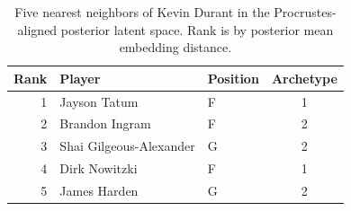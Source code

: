 \begin{table}[htbp]
  \centering\small
  \begin{tabular}{rllc}
    \toprule
    Rank & Player & Position & Archetype \\
    \midrule
    1 & Jayson Tatum & F & 1 \\
    2 & Brandon Ingram & F & 2 \\
    3 & Shai Gilgeous-Alexander & G & 2 \\
    4 & Dirk Nowitzki & F & 1 \\
    5 & James Harden & G & 2 \\
    \bottomrule
  \end{tabular}
  \caption{Five nearest neighbors of Kevin Durant in the Procrustes-aligned posterior latent space. Rank is by posterior mean embedding distance.}
  \label{tab:Kevin_Durant_neighbors}
\end{table}

